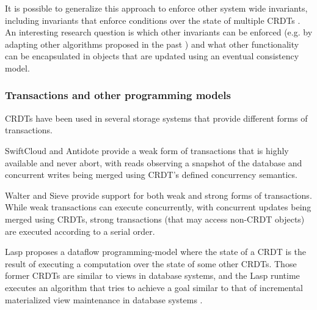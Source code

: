 \documentclass[12pt]{article}
\begin{document}
It is possible to generalize this approach to enforce other system wide 
invariants, including invariants that enforce conditions over the state 
of multiple CRDTs \cite{Balegas15Putting}. 
An interesting research question is which other invariants can be enforced
(e.g. by adapting other algorithms proposed in the past \cite{Barbara94Demarcation,Walborn95Supporting})
and what other functionality can be encapsulated in objects that are updated
using an eventual consistency model. 


\subsubsection{Transactions and other programming models}\label{sec:appdev:adv:tx}
CRDTs have been used in several storage systems that provide different forms of 
transactions.

SwiftCloud \cite{swiftcloud} and Antidote \cite{Akkoorath16Cure}
provide a weak form of transactions that is highly available \cite{hat} and 
never abort, with reads observing a snapshot of the database and concurrent writes 
being merged using CRDT's defined concurrency semantics.   

Walter \cite{Sovran11Transactional} and Sieve \cite{Li14Automating} provide
support for both weak and strong forms of transactions. 
While weak transactions can execute concurrently, with concurrent updates 
being merged using CRDTs, strong transactions (that may access non-CRDT objects)
are executed according to a serial order.

Lasp \cite{lasp} proposes a dataflow programming-model where the state of a CRDT
is the result of executing a computation over the state of some other CRDTs. 
Those former CRDTs are similar to views in database systems, and the Lasp runtime 
executes an algorithm that tries to achieve a goal similar to that of incremental 
materialized view maintenance in database systems \cite{Gupta99Maintenance}.
\end{document}
